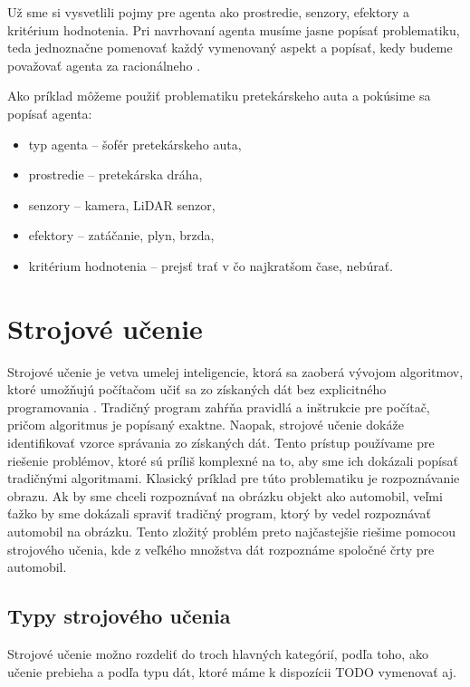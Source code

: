 Už sme si vysvetlili pojmy pre agenta ako prostredie, senzory, efektory a kritérium hodnotenia. Pri navrhovaní agenta musíme jasne popísať problematiku, teda jednoznačne pomenovať každý vymenovaný aspekt a popísať, kedy budeme považovať agenta za racionálneho \cite{artificial_intelligence_modern_aproach}.

Ako príklad môžeme použiť problematiku pretekárskeho auta a pokúsime sa popísať agenta:

\begin{itemize}
\item  typ agenta – šofér pretekárskeho auta,
\item  prostredie – pretekárska dráha,
\item  senzory – kamera, LiDAR senzor,
\item  efektory – zatáčanie, plyn, brzda,
\item  kritérium hodnotenia – prejsť trať v čo najkratšom čase, nebúrať.
\end{itemize}


\section{Strojové učenie}
\label{sec:strojove_ucenie}

Strojové učenie je vetva umelej inteligencie, ktorá sa zaoberá vývojom algoritmov, ktoré umožňujú počítačom učiť sa zo získaných dát bez explicitného programovania \cite{artificial_intelligence_modern_aproach}. Tradičný program zahŕňa pravidlá a inštrukcie pre počítač, pričom algoritmus je popísaný exaktne. Naopak, strojové učenie dokáže identifikovať vzorce správania zo získaných dát. Tento prístup používame pre riešenie problémov, ktoré sú príliš komplexné na to, aby sme ich dokázali popísať tradičnými algoritmami. Klasický príklad pre túto problematiku je rozpoznávanie obrazu. Ak by sme chceli rozpoznávať na obrázku objekt ako automobil, veľmi ťažko by sme dokázali spraviť tradičný program, ktorý by vedel rozpoznávať automobil na obrázku. Tento zložitý problém preto najčastejšie riešime pomocou strojového učenia, kde z veľkého množstva dát rozpoznáme spoločné črty pre automobil.

\subsection{Typy strojového učenia}

Strojové učenie možno rozdeliť do troch hlavných kategórií, podľa toho, ako učenie prebieha a podľa typu dát, ktoré máme k dispozícii \cite{artificial_intelligence_modern_aproach} TODO vymenovať aj.

